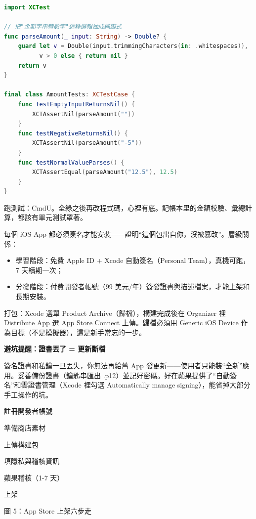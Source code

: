 \begin{lstlisting}[language=Swift]
import XCTest

// 把"金額字串轉數字"這種邏輯抽成純函式
func parseAmount(_ input: String) -> Double? {
    guard let v = Double(input.trimmingCharacters(in: .whitespaces)),
          v > 0 else { return nil }
    return v
}

final class AmountTests: XCTestCase {
    func testEmptyInputReturnsNil() {
        XCTAssertNil(parseAmount(""))
    }
    func testNegativeReturnsNil() {
        XCTAssertNil(parseAmount("-5"))
    }
    func testNormalValueParses() {
        XCTAssertEqual(parseAmount("12.5"), 12.5)
    }
}
\end{lstlisting}

跑測試：CmdU。全綠之後再改程式碼，心裡有底。記帳本里的金額校驗、彙總計算，都該有單元測試罩著。


每個 iOS App 都必須簽名才能安裝——證明“這個包出自你，沒被篡改”。層級關係：

\begin{itemize}
  \item 學習階段：免費 Apple ID + Xcode 自動簽名（Personal Team），真機可跑，7 天續期一次；
  \item 分發階段：付費開發者帳號（99 美元/年）簽發證書與描述檔案，才能上架和長期安裝。
\end{itemize}

打包：Xcode 選單 Product Archive（歸檔），構建完成後在 Organizer 裡 Distribute App 選 App Store Connect 上傳。歸檔必須用 Generic iOS Device 作為目標（不是模擬器），這是新手常忘的一步。

\textbf{避坑提醒：證書丟了 = 更新斷檔}\par

簽名證書和私鑰一旦丟失，你無法再給舊 App 發更新——使用者只能裝“全新”應用。妥善備份證書（鑰匙串匯出 .p12）並記好密碼。好在蘋果提供了“自動簽名”和雲證書管理（Xcode 裡勾選 Automatically manage signing），能省掉大部分手工操作的坑。


註冊開發者帳號

準備商店素材

上傳構建包

填隱私與稽核資訊

蘋果稽核（1-7 天）

上架

\begin{center}\small\color{gray}圖 5：App Store 上架六步走\end{center}

